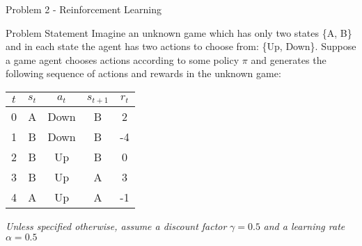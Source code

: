 \begin{problem}{Problem 2 - Reinforcement Learning}
    \begin{statement}{Problem Statement}
        Imagine an unknown game which has only two states \{A, B\} and in each state the agent has two actions to choose from: \{Up, Down\}. Suppose a game agent chooses actions according to some policy 
        $\pi$ and generates the following sequence of actions and rewards in the unknown game:

        \begin{center}
            \begin{tabular}[ht]{|c|c|c|c|c|}
                \hline $t$ & $s_{t}$ & $a_{t}$ & $s_{t+1}$ & $r_{t}$ \\ \hline
                0 & A & Down & B & 2 \\ \hline
                1 & B & Down & B & -4 \\ \hline
                2 & B & Up & B & 0 \\ \hline
                3 & B & Up & A & 3 \\ \hline
                4 & A & Up & A & -1 \\ \hline
            \end{tabular}
        \end{center}
        \textit{Unless specified otherwise, assume a discount factor} $\gamma = 0.5$ \textit{and a learning rate} $\alpha = 0.5$


\end{statement}
\end{problem}
